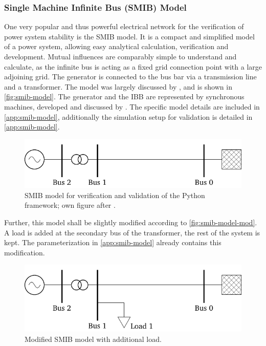 \subsubsection{Single Machine Infinite Bus (SMIB) Model}

One very popular and thus powerful electrical network for the verification of power system stability is the \acs{SMIB} model. 
It is a compact and simplified model of a power system, allowing easy analytical calculation, verification and development. 
Mutual influences are comparably simple to understand and calculate, as the infinite bus is acting as a fixed grid connection point with a large adjoining grid. 
The generator is connected to the bus bar via a transmission line and a transformer. 
The model was largely discussed by \textcite{kundur_2022}, and is shown in \autoref{fig:smib-model}. 
The generator and the \acf{IBB} are represented by synchronous machines, developed and discussed by \textcite{kordowich_2023}. 
The specific model details are included in \autoref{app:smib-model}, additionally the simulation setup for validation is detailed in \autoref{app:smib-model}.

\begin{figure}[htbp!]
    \centering
    \vspace{12pt}
    \includegraphics{tikz_graphics/images/smib_model.pdf}
    \vspace{12pt}
    \caption[Single line respresentation of the \acs{SMIB} model]{\acf{SMIB} model for verification and validation of the Python framework; own figure after \autocite{machowski_2020,kundur_2022}.}
    \label{fig:smib-model}
\end{figure}

Further, this model shall be slightly modified according to \autoref{fig:smib-model-mod}. 
A load is added at the secondary bus of the transformer, the rest of the system is kept. 
The parameterization in \autoref{app:smib-model} already contains this modification.

\begin{figure}[htbp!]
    \centering
    \vspace{12pt}
    \includegraphics{tikz_graphics/images/smib_model_with_load.pdf}
    \vspace{12pt}
    \caption[Modified \acf{SMIB} model with additional load]{Modified \acf{SMIB} model with additional load.}
    \label{fig:smib-model-mod}
\end{figure}

